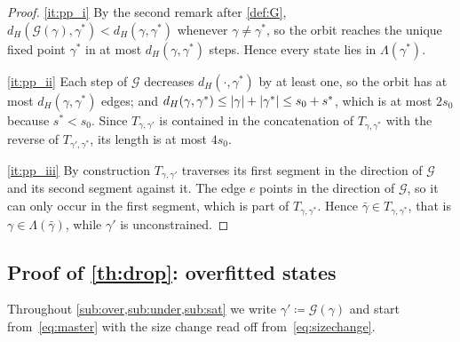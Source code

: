 \begin{proof}
    \ref{it:pp_i} By the second remark after \cref{def:G},
    $d_H(\mathcal{G}(\gamma),\gamma^{\ast})<d_H(\gamma,\gamma^{\ast})$
    whenever $\gamma\neq\gamma^{\ast}$, so the orbit reaches the unique
    fixed point $\gamma^{\ast}$ in at most
    $d_H(\gamma,\gamma^{\ast})$ steps. Hence every state lies in
    $\Lambda(\gamma^{\ast})$.

    \ref{it:pp_ii} Each step of $\mathcal{G}$ decreases
    $d_H(\cdot,\gamma^{\ast})$ by at least one, so the orbit has at most
    $d_H(\gamma,\gamma^{\ast})$ edges; and
    $d_H(\gamma,\gamma^{\ast})\leq\lvert\gamma\rvert+\lvert\gamma^{\ast}\rvert
    \leq s_0+s^{\ast}$, which is at most $2s_0$ because
    $s^{\ast}<s_0$. Since $T_{\gamma,\gamma'}$ is contained in the
    concatenation of $T_{\gamma,\gamma^{\ast}}$ with the reverse of
    $T_{\gamma',\gamma^{\ast}}$, its length is at most $4s_0$.

    \ref{it:pp_iii} By construction $T_{\gamma,\gamma'}$ traverses its
    first segment in the direction of $\mathcal{G}$ and its second
    segment against it. The edge $e$ points in the direction of
    $\mathcal{G}$, so it can only occur in the first segment, which is
    part of $T_{\gamma,\gamma^{\ast}}$. Hence $\bar\gamma\in
    T_{\gamma,\gamma^{\ast}}$, that is $\gamma\in\Lambda(\bar\gamma)$,
    while $\gamma'$ is unconstrained.
\end{proof}

\subsection{Proof of \cref{th:drop}: overfitted states}
\label{sub:over}

Throughout \cref{sub:over,sub:under,sub:sat} we write
$\gamma'\coloneq\mathcal{G}(\gamma)$ and start from~\eqref{eq:master} with
the size change read off from~\eqref{eq:sizechange}.

